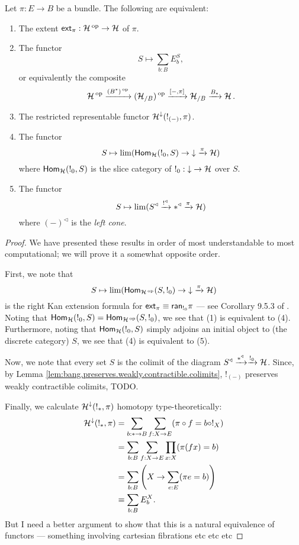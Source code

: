 \begin{prop}\label{prop:set.characterizing.extent}
  Let $\pi : E \to B$ be a bundle. The following are equivalent:
  \begin{enumerate}
  \item The extent $\operatorname{\mathsf{{ext}}}_{\pi} : \operatorname{\mathcal{H}}\operatorname{^\text{op}} \to \operatorname{\mathcal{H}}$ of $\pi$.
  \item The functor
    $$S \mapsto \sum_{b : B} E_b^S,$$
    or equivalently the composite
  $$\operatorname{\mathcal{H}}\operatorname{^\text{op}} \xrightarrow{(B^{\ast})\operatorname{^\text{op}}} (\operatorname{\mathcal{H}}_{/B})\operatorname{^\text{op}} \xrightarrow{[-, \pi]} \operatorname{\mathcal{H}}_{/B}
  \xrightarrow{B_{\ast}} \operatorname{\mathcal{H}}.$$
\item The restricted representable functor
  $\operatorname{\mathcal{H}}^{\mathbin{\downarrow}}(!_{(-)}, \pi)$.
\item The functor
  $$S \mapsto \lim(\operatorname{\mathsf{Hom}}_{\operatorname{\mathcal{H}}}(!_0, S) \to \mathbin{\downarrow} \xrightarrow{\pi} \operatorname{\mathcal{H}})$$
  where $\operatorname{\mathsf{Hom}}_{\operatorname{\mathcal{H}}}(!_0, S)$ is the slice category of $!_0 : \mathbin{\downarrow} \to
  \operatorname{\mathcal{H}}$ over $S$.
\item The functor
  $$S \mapsto \lim(S^{\triangleleft} \xrightarrow{!^{\triangleleft}} \ast^{\triangleleft}
  \xrightarrow{\pi} \operatorname{\mathcal{H}})$$
  where $(-)^{\triangleleft}$ is the \emph{left cone}.
  \end{enumerate}
\end{prop}
\begin{proof}
We have presented these results in order of most understandable to most
computational; we will prove it a somewhat opposite order.

First, we note that 
$$S \mapsto \lim(\operatorname{\mathsf{Hom}}_{\operatorname{\mathcal{H}}\operatorname{^\text{op}}}(S, !_0) \to \mathbin{\downarrow} \xrightarrow{\pi} \operatorname{\mathcal{H}})$$
is the right Kan extension formula for $\operatorname{\mathsf{{ext}}}_{\pi} \equiv
\mathsf{{ran}}_{!_0} \pi$ --- see Corollary 9.5.3 of \cite{RV:Elements}. Noting that $\operatorname{\mathsf{Hom}}_{\operatorname{\mathcal{H}}}(!_0, S) = \operatorname{\mathsf{Hom}}_{\operatorname{\mathcal{H}}\operatorname{^\text{op}}}(S,
!_0)$, we see that (1) is equivalent to (4). Furthermore, noting that
$\operatorname{\mathsf{Hom}}_{\operatorname{\mathcal{H}}}(!_0, S)$ simply adjoins an initial object to (the discrete
category) $S$, we see that (4) is equivalent to (5).

Now, we note that every set $S$ is the colimit of the diagram $S^{\triangleleft}
\xrightarrow{\ast^{\triangleleft}} \xrightarrow{!_0} \operatorname{\mathcal{H}}$. Since, by Lemma \ref{lem:bang.preserves.weakly.contractible.colimits}, $!_{(-)}$
preserves weakly contractible colimits, {\color{red} TODO}.

Finally, we calculate $\operatorname{\mathcal{H}}^{\mathbin{\downarrow}}(!_{\ast}, \pi)$ homotopy type-theoretically:
\begin{align*}
\operatorname{\mathcal{H}}^{\mathbin{\downarrow}}(!_{\ast}, \pi) &= \sum_{b : \ast \to B} \sum_{f : X \to E}
                                  (\pi \circ f = b \circ !_X)\\
                                &= \sum_{b : B} \sum_{f : X \to E} \prod_{x : X} (\pi (f x) = b) \\
                                &= \sum_{b : B} \left( X \to \sum_{e : E} (\pi e = b) \right) \\
                                  &\equiv \sum_{b : B}E_b^X.
\end{align*}
{\color{red} But I need a better argument to show that this is a natural
  equivalence of functors --- something involving cartesian fibrations etc etc etc}
\end{proof}

